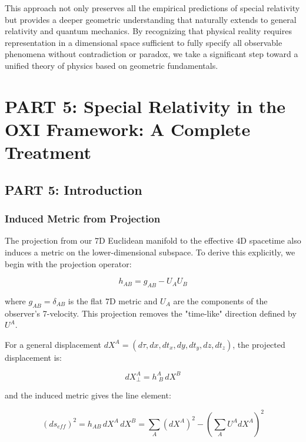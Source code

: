 \documentclass{article}
\begin{document}
This approach not only preserves all the empirical predictions of special relativity but provides a deeper geometric understanding that naturally extends to general relativity and quantum mechanics. By recognizing that physical reality requires representation in a dimensional space sufficient to fully specify all observable phenomena without contradiction or paradox, we take a significant step toward a unified theory of physics based on geometric fundamentals.













\section{PART 5: Special Relativity in the OXI Framework: A Complete Treatment}

\subsection{PART 5: Introduction}

\subsubsection{Induced Metric from Projection}

The projection from our 7D Euclidean manifold to the effective 4D spacetime also induces a metric on the lower-dimensional subspace. To derive this explicitly, we begin with the projection operator:

\begin{equation}
h_{AB} = g_{AB} - U_A U_B
\end{equation}

where $g_{AB} = \delta_{AB}$ is the flat 7D metric and $U_A$ are the components of the observer's 7-velocity. This projection removes the "time-like" direction defined by $U^A$.

For a general displacement $dX^A = (d\tau, dx, dt_x, dy, dt_y, dz, dt_z)$, the projected displacement is:

\begin{equation}
dX_\perp^A = h^A_{\,\,B} \, dX^B
\end{equation}

and the induced metric gives the line element:

\begin{equation}
(ds_{eff})^2 = h_{AB} \, dX^A \, dX^B = \sum_A (dX^A)^2 - \left(\sum_A U^A dX^A\right)^2
\end{equation}
\end{document}
